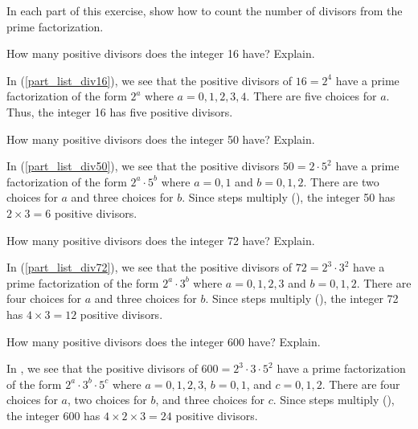 \begin{exam}
\label{exam_count_div_from_prime_fact}
    In each part of this exercise, show how to count the number of divisors from the prime factorization.
        \begin{apart}
            \item How many positive divisors does the integer 16 have?  Explain.
                \begin{soln}
                    In  (\ref{part_list_div16}), we see that the positive divisors of $16 = 2^4$ have a prime factorization of the form $2^a$ where $a=0,1,2,3,4$. There are five choices for $a$.  Thus, the integer 16 has five positive divisors.
                \end{soln}
            \item How many positive divisors does the integer 50 have?  Explain.
                \begin{soln}
                    In  (\ref{part_list_div50}), we see that the positive divisors $50 = 2 \cdot 5^2$ have a prime factorization of the form $2^a\cdot 5^b$ where $a=0,1$ and $b = 0,1,2$. There are two choices for $a$ and three choices for $b$. Since steps multiply (), the integer 50 has $2 \times 3 = 6$ positive divisors.
                \end{soln}
            \item How many positive divisors does the integer 72 have?  Explain.
                \begin{soln}
                    In  (\ref{part_list_div72}), we see that the positive divisors of $72 = 2^3 \cdot 3^2$ have a prime factorization of the form $2^a\cdot 3^b$ where $a=0,1,2,3$ and $b = 0,1,2$.  There are four choices for $a$ and three choices for $b$.  Since steps multiply (), the integer 72 has $4 \times 3 = 12$ positive divisors. 
                \end{soln}
            \item How many positive divisors does the integer 600 have?  Explain.
                \begin{soln}
                    In , we see that the positive divisors of $600 = 2^3 \cdot 3 \cdot 5^2$ have a prime factorization of the form $2^a \cdot 3^b \cdot 5^c$ where $a=0,1,2,3$, $b=0,1$, and $c=0,1,2$. There are four choices for $a$, two choices for $b$, and three choices for $c$. Since steps multiply (), the integer 600 has $4 \times 2 \times 3 = 24$ positive divisors. 
                \end{soln}
        \end{apart}
\end{exam}

